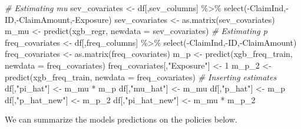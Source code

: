 \documentclass[
]{article}
\newenvironment{Shaded}{\begin{snugshade}}{\end{snugshade}}
\newcommand{\AttributeTok}[1]{\textcolor[rgb]{0.77,0.63,0.00}{#1}}
\newcommand{\CommentTok}[1]{\textcolor[rgb]{0.56,0.35,0.01}{\textit{#1}}}
\newcommand{\DecValTok}[1]{\textcolor[rgb]{0.00,0.00,0.81}{#1}}
\newcommand{\FunctionTok}[1]{\textcolor[rgb]{0.00,0.00,0.00}{#1}}
\newcommand{\NormalTok}[1]{#1}
\newcommand{\OtherTok}[1]{\textcolor[rgb]{0.56,0.35,0.01}{#1}}
\newcommand{\SpecialCharTok}[1]{\textcolor[rgb]{0.00,0.00,0.00}{#1}}
\newcommand{\StringTok}[1]{\textcolor[rgb]{0.31,0.60,0.02}{#1}}
\begin{document}
\begin{Shaded}
\begin{Highlighting}[]
\CommentTok{\# Estimating mu}
\NormalTok{sev\_covariates }\OtherTok{\textless{}{-}}\NormalTok{ df[,sev\_columns] }\SpecialCharTok{\%\textgreater{}\%}
  \FunctionTok{select}\NormalTok{(}\SpecialCharTok{{-}}\NormalTok{ClaimInd,}\SpecialCharTok{{-}}\NormalTok{ID,}\SpecialCharTok{{-}}\NormalTok{ClaimAmount,}\SpecialCharTok{{-}}\NormalTok{Exposure)}
\NormalTok{sev\_covariates }\OtherTok{\textless{}{-}}  \FunctionTok{as.matrix}\NormalTok{(sev\_covariates)}
\NormalTok{m\_mu }\OtherTok{\textless{}{-}} \FunctionTok{predict}\NormalTok{(xgb\_regr, }\AttributeTok{newdata =}\NormalTok{ sev\_covariates)}
\CommentTok{\# Estimating p}
\NormalTok{freq\_covariates }\OtherTok{\textless{}{-}}\NormalTok{ df[,freq\_columns] }\SpecialCharTok{\%\textgreater{}\%}
  \FunctionTok{select}\NormalTok{(}\SpecialCharTok{{-}}\NormalTok{ClaimInd,}\SpecialCharTok{{-}}\NormalTok{ID,}\SpecialCharTok{{-}}\NormalTok{ClaimAmount)}
\NormalTok{freq\_covariates }\OtherTok{\textless{}{-}} \FunctionTok{as.matrix}\NormalTok{(freq\_covariates)}
\NormalTok{m\_p }\OtherTok{\textless{}{-}} \FunctionTok{predict}\NormalTok{(xgb\_freq\_train, }\AttributeTok{newdata =}\NormalTok{ freq\_covariates)}
\NormalTok{freq\_covariates[,}\StringTok{"Exposure"}\NormalTok{] }\OtherTok{\textless{}{-}} \DecValTok{1}
\NormalTok{m\_p\_2 }\OtherTok{\textless{}{-}} \FunctionTok{predict}\NormalTok{(xgb\_freq\_train, }\AttributeTok{newdata =}\NormalTok{ freq\_covariates)}
\CommentTok{\# Inserting estimates}
\NormalTok{df[,}\StringTok{"pi\_hat"}\NormalTok{] }\OtherTok{\textless{}{-}}\NormalTok{ m\_mu }\SpecialCharTok{*}\NormalTok{ m\_p}
\NormalTok{df[,}\StringTok{"mu\_hat"}\NormalTok{] }\OtherTok{\textless{}{-}}\NormalTok{ m\_mu}
\NormalTok{df[,}\StringTok{"p\_hat"}\NormalTok{] }\OtherTok{\textless{}{-}}\NormalTok{ m\_p}
\NormalTok{df[,}\StringTok{"p\_hat\_new"}\NormalTok{] }\OtherTok{\textless{}{-}}\NormalTok{ m\_p\_2}
\NormalTok{df[,}\StringTok{"pi\_hat\_new"}\NormalTok{] }\OtherTok{\textless{}{-}}\NormalTok{ m\_mu }\SpecialCharTok{*}\NormalTok{ m\_p\_2}
\end{Highlighting}
\end{Shaded}

We can summarize the models predictions on the policies below.
\end{document}
